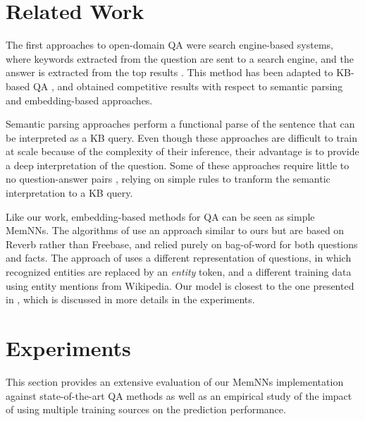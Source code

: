 \documentclass[11pt,a4paper]{article}
\newcommand{\fb}{{\sf Freebase}\xspace}
\newcommand{\rv}{{\sf Reverb}\xspace}
\begin{document}
\section{Related Work}
\label{sec:related}

The first approaches to open-domain QA were search engine-based
systems, where keywords extracted from the question are sent to a
search engine, and the answer is extracted from the top results
\cite{yahya2012natural,unger2012template}. This method has been
adapted to KB-based QA \cite{yahya2012natural,unger2012template}, and
obtained competitive results with respect to semantic parsing and
embedding-based approaches.

Semantic parsing approaches
\cite{cai-yates:2013:ACL2013,berant-EtAl:2013:EMNLP,kwiatkowski-EtAl:2013:EMNLP,berant2014semantic,fader2014open}
perform a functional parse of the sentence that can be interpreted as
a KB query. Even though these approaches are difficult to train at
scale because of the complexity of their inference, their advantage is
to provide a deep interpretation of the question. Some of these
approaches require little to no question-answer pairs
\cite{paralex,reddy2014large}, relying on simple rules to tranform the
semantic interpretation to a KB query.

Like our work, embedding-based methods for QA can be seen as simple
MemNNs. The algorithms of \cite{bordes2014open,weston2014memory} use
an approach similar to ours but are based on \rv rather than \fb, and
relied purely on bag-of-word for both questions and facts. The
approach of \cite{yang2014joint} uses a different representation of
questions, in which recognized entities are replaced by an {\it
  entity} token, and a different training data using entity
mentions from {\sc Wikipedia}. Our model is closest to the one presented
in \cite{bordes-chopra-weston:2014:EMNLP2014}, which is discussed in
more details in the experiments.



\section{Experiments}
\label{sec:expes}
This section provides an extensive evaluation of our MemNNs
implementation against state-of-the-art QA methods as well as an
empirical study of the impact of using multiple training sources on
the prediction performance.
\end{document}

